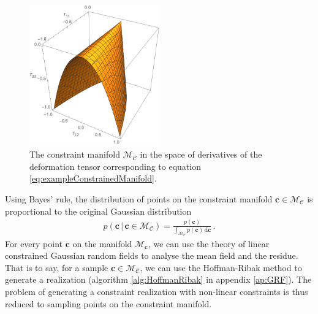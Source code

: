 \documentclass[a4paper, 11pt]{article}
\begin{document}
\begin{figure}
\centering
\includegraphics[width=0.5\textwidth]{ConstraintManifold}
%
% 
%
\caption{The constraint manifold $\mathcal{M}_\mathcal{C}$ in the space of derivatives of the deformation tensor corresponding to equation \eqref{eq:exampleConstrainedManifold}.}
\label{fig:ConstrainedManifold}
\end{figure}

Using Bayes' rule, the distribution of points on the constraint manifold $\bm{c} \in \mathcal{M}_{\mathcal{C}}$ is proportional to the original Gaussian distribution
\begin{align}
p(\bm{c}\,|\,\bm{c}\in \mathcal{M}_{\mathcal{C}})  = \frac{p(\bm{c})}{\int_{\mathcal{M}_\mathcal{C}} p(\bm{c})\, \mathrm{d}\bm{c}}\,.
\end{align}
For every point $\bm{c}$ on the manifold $\mathcal{M}_{\bm{c}}$, we can use the theory of linear constrained Gaussian random fields to analyse the mean field and the residue. That is to say, for a sample $\bm{c} \in \mathcal{M}_\mathcal{C}$, we can use the Hoffman-Ribak method to generate a realization (algorithm \ref{alg:HoffmanRibak} in appendix \ref{ap:GRF}). The problem of generating a constraint realization with non-linear constraints is thus reduced to sampling points on the constraint manifold.
\end{document}
